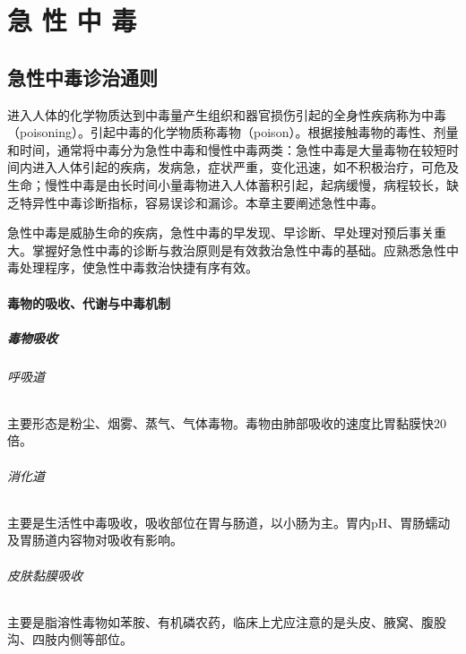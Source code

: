 \part{急 性 中 毒}

\chapter{急性中毒诊治通则}

进入人体的化学物质达到中毒量产生组织和器官损伤引起的全身性疾病称为中毒（poisoning）。引起中毒的化学物质称毒物（poison）。根据接触毒物的毒性、剂量和时间，通常将中毒分为急性中毒和慢性中毒两类：急性中毒是大量毒物在较短时间内进入人体引起的疾病，发病急，症状严重，变化迅速，如不积极治疗，可危及生命；慢性中毒是由长时间小量毒物进入人体蓄积引起，起病缓慢，病程较长，缺乏特异性中毒诊断指标，容易误诊和漏诊。本章主要阐述急性中毒。

急性中毒是威胁生命的疾病，急性中毒的早发现、早诊断、早处理对预后事关重大。掌握好急性中毒的诊断与救治原则是有效救治急性中毒的基础。应熟悉急性中毒处理程序，使急性中毒救治快捷有序有效。

\subsection{毒物的吸收、代谢与中毒机制}

\subsubsection{毒物吸收}

\paragraph{呼吸道}

主要形态是粉尘、烟雾、蒸气、气体毒物。毒物由肺部吸收的速度比胃黏膜快20倍。

\paragraph{消化道}

主要是生活性中毒吸收，吸收部位在胃与肠道，以小肠为主。胃内pH、胃肠蠕动及胃肠道内容物对吸收有影响。

\paragraph{皮肤黏膜吸收}

主要是脂溶性毒物如苯胺、有机磷农药，临床上尤应注意的是头皮、腋窝、腹股沟、四肢内侧等部位。

